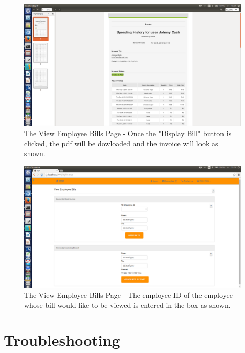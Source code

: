 \documentclass[a4paper,12pt]{report}
\begin{document}
\begin{figure}[H]
  \centering
    \includegraphics[width=1.0\textwidth]{screenshots/bill3.png}
    \caption{The View Employee Bills Page - Once the "Display Bill" button is clicked, the pdf will be dowloaded and the invoice will look as shown.}
\end{figure}
\begin{figure}[H]
  \centering
    \includegraphics[width=1.0\textwidth]{screenshots/bill1.png}
    \caption{The View Employee Bills Page - The employee ID of the employee whose bill would like to be viewed is entered in the box as shown.}
\end{figure}

\section{Troubleshooting}
\end{document}
